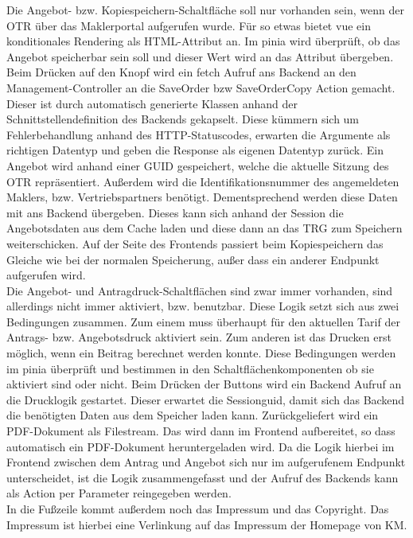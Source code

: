 Die Angebot- bzw. Kopiespeichern-Schaltfläche soll nur vorhanden sein, wenn der \ac{OTR} über das Maklerportal aufgerufen wurde. Für so etwas bietet \gls{vue} ein konditionales Rendering als \gls{HTML}-Attribut an. Im \gls{pinia} wird überprüft, ob das Angebot speicherbar sein soll und dieser Wert wird an das Attribut übergeben. Beim Drücken auf den Knopf wird ein \gls{fetch} Aufruf ans Backend an den Management-Controller an die SaveOrder bzw SaveOrderCopy Action  gemacht. Dieser ist durch automatisch generierte Klassen anhand der Schnittstellendefinition des Backends gekapselt. Diese kümmern sich um Fehlerbehandlung anhand des \gls{HTTP}-Statuscodes, erwarten die Argumente als richtigen Datentyp und geben die Response als eigenen Datentyp zurück. Ein Angebot wird anhand einer \ac{GUID} gespeichert, welche die aktuelle Sitzung des \ac{OTR} repräsentiert. Außerdem wird die Identifikationsnummer des angemeldeten Maklers, bzw. Vertriebspartners benötigt. Dementsprechend werden diese Daten mit ans Backend übergeben. Dieses kann sich anhand der Session die Angebotsdaten aus dem Cache laden und diese dann an das \ac{TRG} zum Speichern weiterschicken. Auf der Seite des Frontends passiert beim Kopiespeichern das Gleiche wie bei der normalen Speicherung, außer dass ein anderer Endpunkt aufgerufen wird.\\

Die Angebot- und Antragdruck-Schaltflächen sind zwar immer vorhanden, sind allerdings nicht immer aktiviert, bzw. benutzbar. Diese Logik setzt sich aus zwei Bedingungen zusammen. Zum einem muss überhaupt für den aktuellen Tarif der Antrags- bzw. Angebotsdruck aktiviert sein. Zum anderen ist das Drucken erst möglich, wenn ein Beitrag berechnet werden konnte. Diese Bedingungen werden im \gls{pinia} überprüft und bestimmen in den Schaltflächenkomponenten ob sie aktiviert sind oder nicht. Beim Drücken der Buttons wird ein Backend Aufruf an die Drucklogik gestartet. Dieser erwartet die Sessionguid, damit sich das Backend die benötigten Daten aus dem Speicher laden kann. Zurückgeliefert wird ein PDF-Dokument als Filestream. Das wird dann im Frontend aufbereitet, so dass automatisch ein PDF-Dokument heruntergeladen wird. Da die Logik hierbei im Frontend zwischen dem Antrag und Angebot sich nur im aufgerufenem Endpunkt unterscheidet, ist die Logik zusammengefasst und der Aufruf des Backends kann als Action per Parameter reingegeben werden.\\
In die Fußzeile kommt außerdem noch das Impressum und das Copyright. Das Impressum ist hierbei eine Verlinkung auf das Impressum der Homepage von \ac{KM}.
